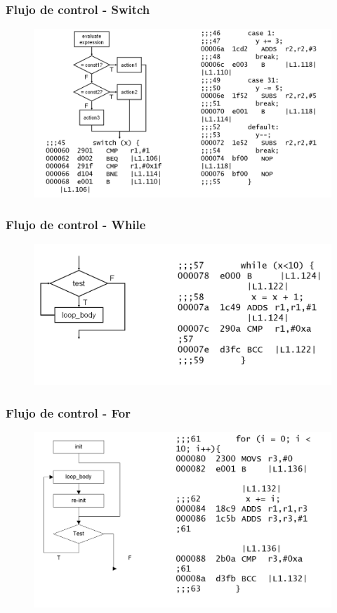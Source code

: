 \documentclass[10.5pt,scale=1.0,t,aspectratio=169,hyperref={pdfpagelabels=false}]{beamer}
\begin{document}
\begin{frame}
	\frametitle{Flujo de control - Switch}
	\begin{figure}
		\centering
		\includegraphics[scale=0.4]{SwitchAssembly}
	\end{figure}
\end{frame}
\begin{frame}
	\frametitle{Flujo de control - While}
	\begin{figure}
		\centering
		\includegraphics[scale=0.4]{WhileAssembly}
	\end{figure}
\end{frame}
\begin{frame}
	\frametitle{Flujo de control - For}
	\begin{figure}
		\centering
		\includegraphics[scale=0.4]{ForAssembly}
	\end{figure}
\end{frame}
\end{document}
